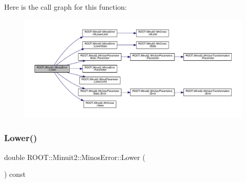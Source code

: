 Here is the call graph for this function\+:
\nopagebreak
\begin{figure}[H]
\begin{center}
\leavevmode
\includegraphics[width=350pt]{d2/dd1/classROOT_1_1Minuit2_1_1MinosError_ac412aab9b0a59a427fbe7e3cfad47f0c_cgraph}
\end{center}
\end{figure}
\mbox{\label{classROOT_1_1Minuit2_1_1MinosError_ac412aab9b0a59a427fbe7e3cfad47f0c}} 
\subsubsection{\texorpdfstring{Lower()}{Lower()}\hspace{0.1cm}{\footnotesize\ttfamily [3/3]}}
{\footnotesize\ttfamily double R\+O\+O\+T\+::\+Minuit2\+::\+Minos\+Error\+::\+Lower (\begin{DoxyParamCaption}{ }\end{DoxyParamCaption}) const\hspace{0.3cm}{\ttfamily [inline]}}


